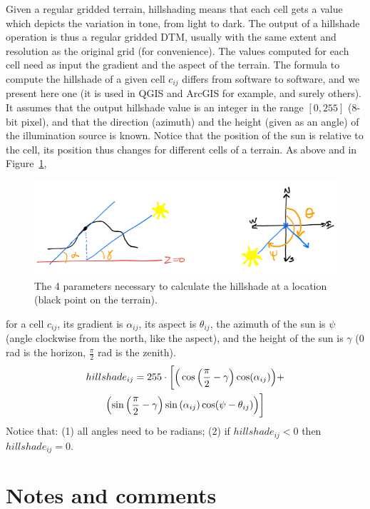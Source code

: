 Given a regular gridded terrain, hillshading means that each cell gets a value which depicts the variation in tone, from light to dark.
The output of a hillshade operation is thus a regular gridded DTM, usually with the same extent and resolution as the original grid (for convenience).
The values computed for each cell need as input the gradient and the aspect of the terrain\@.
The formula to compute the hillshade of a given cell $c_{ij}$ differs from software to software, and we present here one (it is used in QGIS and ArcGIS for example, and surely others).
It assumes that the output hillshade value is an integer in the range $[0,255]$ (8-bit pixel), and that the direction (azimuth) and the height (given as an angle) of the illumination source is known.
Notice that the position of the sun is relative to the cell, its position thus changes for different cells of a terrain\@.
As above and in Figure~\ref{fig:hillshade-params}, 
\begin{figure}
  \centering
  \includegraphics[width=0.95\linewidth]{figs/hillshade-params}
  \caption{The 4 parameters necessary to calculate the hillshade at a location (black point on the terrain).}%
\label{fig:hillshade-params}
\end{figure}
for a cell $c_{ij}$, its gradient is $\alpha_{ij}$, its aspect is $\theta_{ij}$, the azimuth of the sun is $\psi$ (angle clockwise from the north, like the aspect), and the height of the sun is $\gamma$ (0 rad is the horizon, $\frac{\pi}{2}$ rad is the zenith).
\begin{multline}  
  hillshade_{ij} = 255 \cdot \biggl[ \Big( \cos\left(\frac{\pi}{2} - \gamma\right) \cos(\alpha_{ij}) \Big) + \\
                         \Bigl( \sin\left(\frac{\pi}{2} - \gamma\right) \sin\left(\alpha_{ij}\right) \cos(\psi - \theta_{ij}) \Bigr) \biggr]
\end{multline}
Notice that: (1) all angles need to be radians; (2) if $hillshade_{ij} < 0$ then $hillshade_{ij} = 0$.


%
\section{Notes and comments}

